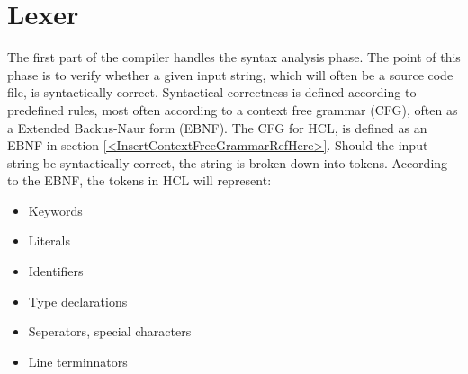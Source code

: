 \section{Lexer}
The first part of the compiler handles the syntax analysis phase. 
The point of this phase is to verify whether a given input string, which will often be a source code file, is syntactically correct.
Syntactical correctness is defined according to predefined rules, most often according to a context free grammar (CFG), often as a Extended Backus-Naur form (EBNF). 
The CFG for HCL, is defined as an EBNF in section  \ref{<InsertContextFreeGrammarRefHere>}.
Should the input string be syntactically correct, the string is broken down into tokens. According to the EBNF, the tokens in HCL will represent:
\begin{itemize}
	\item Keywords
	\item Literals
	\item Identifiers
	\item Type declarations
	\item Seperators, special characters
	\item Line terminnators
\end{itemize}
